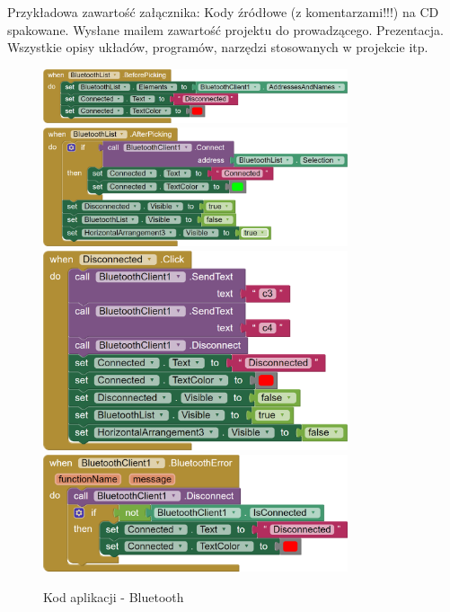 \documentclass[11pt,titlepage,a4paper]{article}
\begin{document}
Przykładowa zawartość załącznika:
Kody źródłowe (z komentarzami!!!) na CD spakowane.
Wysłane mailem zawartość projektu do prowadzącego.
Prezentacja.
Wszystkie opisy układów, programów, narzędzi stosowanych w projekcie itp.

\newpage

\renewcommand*{\lstlistingname}{Załącznik}
\renewcommand*{\figurename}{Załącznik}
\setcounter{figure}{1}



\begin{figure}[p]
    \begin{center}
        \includegraphics[width=0.8\textwidth]{img/app_src/bluetooth/BluetoothListBefore.png}
        \includegraphics[width=0.8\textwidth]{img/app_src/bluetooth/BluetoothListAfter.png}
        \includegraphics[width=0.8\textwidth]{img/app_src/bluetooth/BluetoothDisconnected.png}
        \includegraphics[width=0.8\textwidth]{img/app_src/bluetooth/BluetoothClient.png}
    \end{center}
    \caption{Kod aplikacji - Bluetooth}
    \label{AppBluetooth}
\end{figure}
\end{document}
